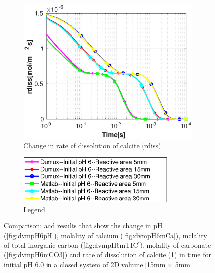 \begin{figure}[!h]
    \hfill
    \begin{subfigure}{.5\linewidth}
            \centering
        \includegraphics[width=\textwidth]{PICTURES/dvm_pH6_rdiss.eps}
        \caption{Change in rate of dissolution of calcite (rdiss)}
        \label{fig:dvmpH6rdiss}
    \end{subfigure}%
  \hfill
  \hfill
    \begin{subfigure}{.5\linewidth}
            \centering
        \includegraphics[width=0.85\textwidth]{PICTURES/dvm_pH6_legend.eps}
        \caption{Legend}
        \label{fig:dvmpH6legend}
    \end{subfigure}%
    \caption{Comparison: \DuMuX and \MATLAB results that show the change in pH (\cref{fig:dvmpH6pH}), molality of calcium (\cref{fig:dvmpH6mCa}), molality of total inorganic carbon (\cref{fig:dvmpH6mTIC}), molality of carbonate (\cref{fig:dvmpH6mCO3}) and rate of dissolution of calcite (\cref{fig:dvmpH6rdiss}) in time for initial pH 6.0 in a closed system of 2D volume [15mm $\times$ 5mm]} 
    \label{fig:comparisionDumuxMatlab_pH6.0}
\end{figure}

\endinput